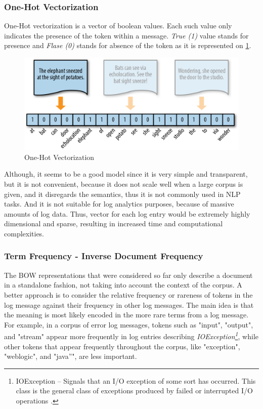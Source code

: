 \documentclass[thesis=M,english]{FITthesis}[2019/12/23]
\begin{document}
\subsubsection{One-Hot Vectorization}
One-Hot vectorization is a vector of boolean values. Each such value only indicates the presence of the token within a message. \textit{True (1)} value stands for presence and \textit{Flase (0)} stands for absence of the token as it is represented on \ref{fig:one-hot}.
\begin{figure}[h!]\centering
	\includegraphics[scale=0.8]{one-hot}
	\caption{One-Hot Vectorization}\label{fig:one-hot}
\end{figure}
Although, it seems to be a good model since it is very simple and transparent, but it is not convenient, because it does not scale well when a large corpus is given, and it disregards the semantics, thus it is not commonly used in NLP tasks. And it is not suitable for log analytics purposes, because of massive amounts of log data. Thus, vector for each log entry would be extremely highly dimensional and sparse, resulting in increased time and computational complexities.


\subsubsection{Term Frequency - Inverse Document Frequency}
The BOW representations that were considered so far only describe a document in a standalone fashion, not taking into account the context of the corpus. A better approach is to consider the relative frequency or rareness of tokens in the log message against their frequency in other log messages. The main idea is that the meaning is most likely encoded in the more rare terms from a log message. 
For example, in a corpus of error log messages, tokens such as "input", "output", and "stream" appear more frequently in log entries describing \textit{IOException\footnote{IOException -- Signals that an I/O exception of some sort has occurred. This class is the general class of exceptions produced by failed or interrupted I/O operations \cite{oracle-ioexception}.}}, while other tokens that appear frequently throughout the corpus, like "exception",  "weblogic", and "java”", are less important.
\end{document}
